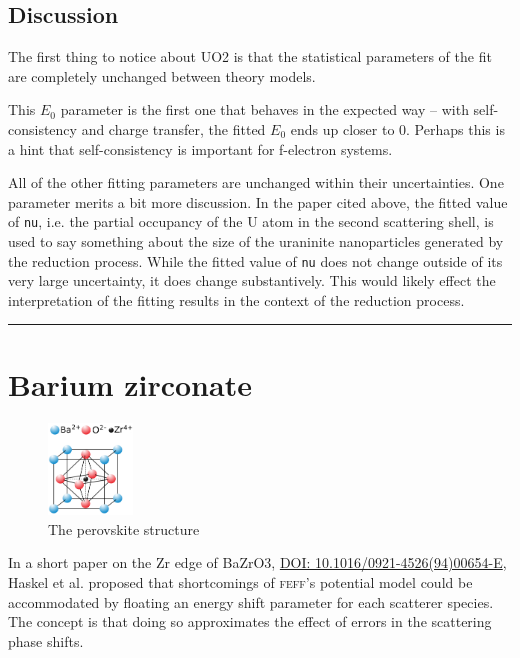 \documentclass[11pt]{article}
\begin{document}
\subsection{Discussion}
\label{sec:orgheadline24}

The first thing to notice about UO2 is that the statistical parameters
of the fit are completely unchanged between theory models.

This $E_0$ parameter is the first one that behaves in the expected way --
with self-consistency and charge transfer, the fitted $E_0$ ends up
closer to 0. Perhaps this is a hint that self-consistency is important
for f-electron systems.

All of the other fitting parameters are unchanged within their
uncertainties. One parameter merits a bit more discussion. In the
paper cited above, the fitted value of \texttt{nu}, i.e. the partial
occupancy of the U atom in the second scattering shell, is used to say
something about the size of the uraninite nanoparticles generated by
the reduction process. While the fitted value of \texttt{nu} does not
change outside of its very large uncertainty, it does change
substantively. This would likely effect the interpretation of the
fitting results in the context of the reduction process.

\rule{\linewidth}{0.5pt}
\pagebreak

\section{Barium zirconate}
\label{sec:orgheadline31}

\begin{figure}
  \begin{center}
    \includegraphics[width=0.2\textwidth]{BaZrO3/perovskite.png}
  \end{center}
  \caption{The perovskite structure}
\end{figure}


In a short paper on the Zr edge of BaZrO3,
\href{http://dx.doi.org/10.1016/0921-4526(94)00654-E}{DOI:
  10.1016/0921-4526(94)00654-E}, Haskel et al. proposed that
shortcomings of \textsc{feff}'s potential model could be accommodated by
floating an energy shift parameter for each scatterer species. The
concept is that doing so approximates the effect of errors in the
scattering phase shifts.
\end{document}
